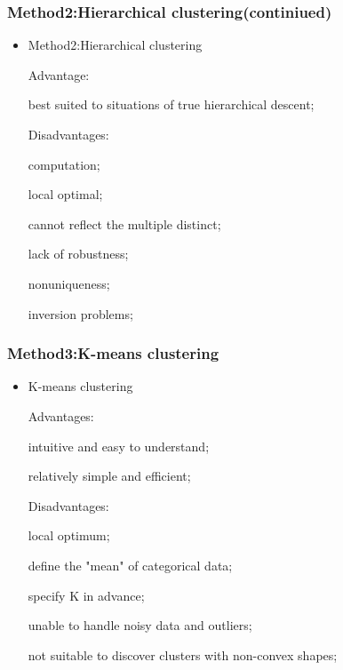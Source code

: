 \begin{frame}
    \frametitle{Method2:Hierarchical clustering(continiued)}
    \begin{itemize}
      \item Method2:Hierarchical clustering

    Advantage: 

    \hspace{0.6em}  best suited to situations of true hierarchical descent;

    Disadvantages:

    \hspace{0.6em}  computation;

    \hspace{0.6em}  local optimal;

    \hspace{0.6em}  cannot reflect the multiple distinct;

    \hspace{0.6em}  lack of robustness;

    \hspace{0.6em}  nonuniqueness;

    \hspace{0.6em}  inversion problems;
   \end{itemize}
\end{frame}

    

    
\begin{frame}
    \frametitle{Method3:K-means clustering}
    \begin{itemize}   
     \item K-means clustering
     
       Advantages: 

        \hspace{0.6em} intuitive and easy to understand;

        \hspace{0.6em} relatively simple and efficient;

       Disadvantages:

       \hspace{0.6em} local optimum;

       \hspace{0.6em} define the "mean" of categorical data;

       \hspace{0.6em} specify K in advance;

       \hspace{0.6em} unable to handle noisy data and outliers;

       \hspace{0.6em} not suitable to discover clusters with non-convex shapes;
    \end{itemize}
\end{frame}

